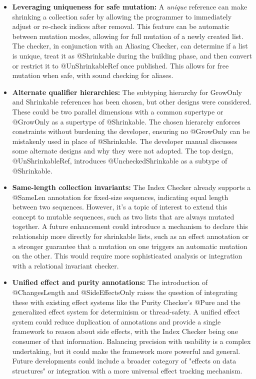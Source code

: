 \begin{itemize}
\item
  \textbf{Leveraging uniqueness for safe mutation:}
    A \emph{unique} reference can make shrinking a collection safer by allowing the programmer
    to immediately adjust or re-check indices after removal. This feature can be automatic
    between mutation modes, allowing for full mutation of a newly created list. The checker,
    in conjunction with an Aliasing Checker, can determine if a list is unique, treat it as
    @Shrinkable during the building phase, and then convert or restrict it to @UnShrinkableRef
    once published. This allows for free mutation when safe, with sound checking for aliases.

\item
  \textbf{Alternate qualifier hierarchies:}
    The subtyping hierarchy for GrowOnly and Shrinkable references has been chosen, but other
    designs were considered. These could be two parallel dimensions with a common supertype or
    @GrowOnly as a supertype of @Shrinkable. The chosen hierarchy enforces constraints without
    burdening the developer, ensuring no @GrowOnly can be mistakenly used in place of @Shrinkable.
    The developer manual discusses some alternate designs and why they were not adopted.
    The top design, @UnShrinkableRef, introduces @UncheckedShrinkable as a subtype of @Shrinkable.

\item
  \textbf{Same-length collection invariants:}
    The Index Checker already supports a @SameLen annotation for fixed-size sequences, indicating
    equal length between two sequences. However, it's a topic of interest to extend this concept
    to mutable sequences, such as two lists that are always mutated together. A future enhancement
    could introduce a mechanism to declare this relationship more directly for shrinkable lists,
    such as an effect annotation or a stronger guarantee that a mutation on one triggers an automatic
    mutation on the other. This would require more sophisticated analysis or integration with a
    relational invariant checker.

\item
  \textbf{Unified effect and purity annotations:}
    The introduction of @ChangesLength and @SideEffectsOnly raises the question of integrating these
    with existing effect systems like the Purity Checker's @Pure and the generalized effect system
    for determinism or thread-safety. A unified effect system could reduce duplication of annotations
    and provide a single framework to reason about side effects, with the Index Checker being one
    consumer of that information. Balancing precision with usability is a complex undertaking, but it
    could make the framework more powerful and general. Future developments could include a broader
    category of "effects on data structures" or integration with a more universal effect tracking mechanism.


\end{itemize}
